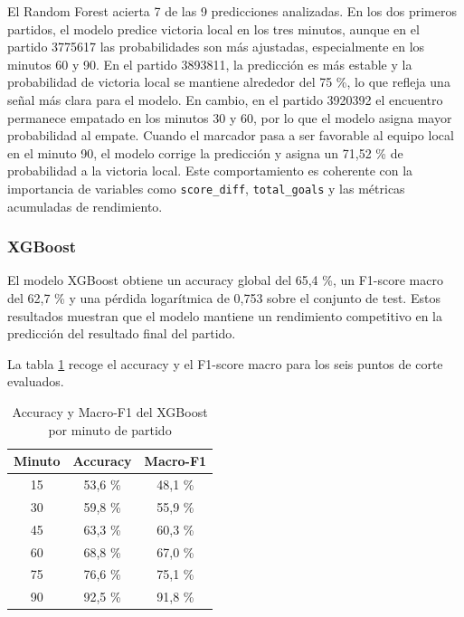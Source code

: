 El Random Forest acierta 7 de las 9 predicciones analizadas. En los dos primeros partidos, el modelo predice victoria local en los tres minutos, aunque en el partido 3775617 las probabilidades son más ajustadas, especialmente en los minutos 60 y 90. En el partido 3893811, la predicción es más estable y la probabilidad de victoria local se mantiene alrededor del 75 \%, lo que refleja una señal más clara para el modelo. En cambio, en el partido 3920392 el encuentro permanece empatado en los minutos 30 y 60, por lo que el modelo asigna mayor probabilidad al empate. Cuando el marcador pasa a ser favorable al equipo local en el minuto 90, el modelo corrige la predicción y asigna un 71,52 \% de probabilidad a la victoria local. Este comportamiento es coherente con la importancia de variables como \texttt{score\_diff}, \texttt{total\_goals} y las métricas acumuladas de rendimiento.

\subsubsection{XGBoost}

El modelo XGBoost obtiene un accuracy global del 65,4 \%, un F1-score macro del 62,7 \% y una pérdida logarítmica de 0,753 sobre el conjunto de test. Estos resultados muestran que el modelo mantiene un rendimiento competitivo en la predicción del resultado final del partido.

La tabla \ref{tab:xgb_por_minuto} recoge el accuracy y el F1-score macro para los seis puntos de corte evaluados.

\begin{table}[H]
    \centering
    \begin{tabular}{ccc}
        \hline
        \textbf{Minuto} & \textbf{Accuracy} & \textbf{Macro-F1} \\
        \hline
        15              & 53,6 \%           & 48,1 \%           \\
        30              & 59,8 \%           & 55,9 \%           \\
        45              & 63,3 \%           & 60,3 \%           \\
        60              & 68,8 \%           & 67,0 \%           \\
        75              & 76,6 \%           & 75,1 \%           \\
        90              & 92,5 \%           & 91,8 \%           \\
        \hline
    \end{tabular}
    \caption{Accuracy y Macro-F1 del XGBoost por minuto de partido}
    \label{tab:xgb_por_minuto}
\end{table}

